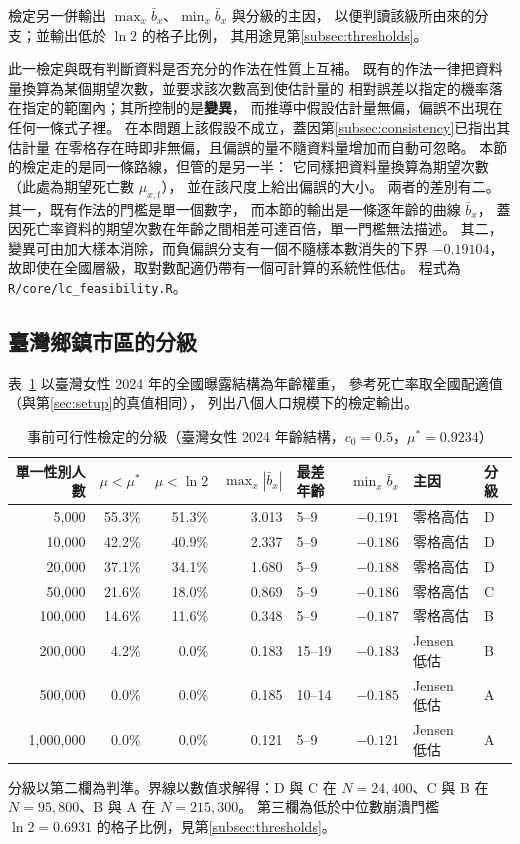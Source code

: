 \documentclass[UTF8, fontset=macnew, a4paper, 12pt]{ctexart}
\begin{document}
檢定另一併輸出 $\max_x\bar b_x$、$\min_x\bar b_x$ 與分級的主因，
以便判讀該級所由來的分支；並輸出低於 $\ln2$ 的格子比例，
其用途見第\ref{subsec:thresholds}。

此一檢定與既有判斷資料是否充分的作法在性質上互補。
既有的作法一律把資料量換算為某個期望次數，並要求該次數高到使估計量的
相對誤差以指定的機率落在指定的範圍內；其所控制的是\textbf{變異}，
而推導中假設估計量無偏，偏誤不出現在任何一條式子裡。
在本問題上該假設不成立，蓋因第\ref{subsec:consistency}已指出其估計量
在零格存在時即非無偏，且偏誤的量不隨資料量增加而自動可忽略。
本節的檢定走的是同一條路線，但管的是另一半：
它同樣把資料量換算為期望次數（此處為期望死亡數 $\mu_{x,t}$），
並在該尺度上給出偏誤的大小。
兩者的差別有二。其一，既有作法的門檻是單一個數字，
而本節的輸出是一條逐年齡的曲線 $\bar b_x$，
蓋因死亡率資料的期望次數在年齡之間相差可達百倍，單一門檻無法描述。
其二，變異可由加大樣本消除，而負偏誤分支有一個不隨樣本數消失的下界
$-0.19104$，故即使在全國層級，取對數配適仍帶有一個可計算的系統性低估。
程式為 \texttt{R/core/lc\_feasibility.R}。


\subsection{臺灣鄉鎮市區的分級}\label{subsec:grade}

表~\ref{tab:feas} 以臺灣女性 2024 年的全國曝露結構為年齡權重，
參考死亡率取全國配適值（與第\ref{sec:setup}的真值相同），
列出八個人口規模下的檢定輸出。

\begin{table}[H]
\centering
\caption{事前可行性檢定的分級（臺灣女性 2024 年齡結構，$c_0=0.5$，$\mu^\ast=0.9234$）}
\small
\begin{tabular}{rrrrlrll}
\toprule
單一性別人數 & $\mu<\mu^\ast$ & $\mu<\ln2$ & $\max_x|\bar b_x|$ & 最差年齡
 & $\min_x\bar b_x$ & 主因 & 分級\\
\midrule
5,000     & 55.3\% & 51.3\% & 3.013 & 5--9   & $-0.191$ & 零格高估 & D\\
10,000    & 42.2\% & 40.9\% & 2.337 & 5--9   & $-0.186$ & 零格高估 & D\\
20,000    & 37.1\% & 34.1\% & 1.680 & 5--9   & $-0.188$ & 零格高估 & D\\
50,000    & 21.6\% & 18.0\% & 0.869 & 5--9   & $-0.186$ & 零格高估 & C\\
100,000   & 14.6\% & 11.6\% & 0.348 & 5--9   & $-0.187$ & 零格高估 & B\\
200,000   & 4.2\%  & 0.0\%  & 0.183 & 15--19 & $-0.183$ & Jensen 低估 & B\\
500,000   & 0.0\%  & 0.0\%  & 0.185 & 10--14 & $-0.185$ & Jensen 低估 & A\\
1,000,000 & 0.0\%  & 0.0\%  & 0.121 & 5--9   & $-0.121$ & Jensen 低估 & A\\
\bottomrule
\end{tabular}

\vspace{3pt}
{\footnotesize 分級以第二欄為判準。界線以數值求解得：D 與 C 在
$N=24{,}400$、C 與 B 在 $N=95{,}800$、B 與 A 在 $N=215{,}300$。
第三欄為低於中位數崩潰門檻 $\ln2=0.6931$ 的格子比例，見第\ref{subsec:thresholds}。}
\label{tab:feas}
\end{table}
\end{document}
